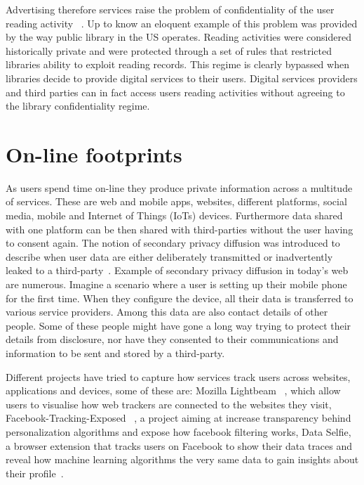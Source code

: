 Advertising therefore services raise the problem of confidentiality of the user reading activity ~\cite{ard2013confidentiality}. Up to know an eloquent example of this problem was provided by the way public library in the US operates. Reading activities were considered historically private and were protected through a set of rules that restricted libraries ability to exploit reading records. This regime is clearly bypassed when libraries decide to provide digital services to their users. Digital services providers and third parties can in fact access users reading activities without agreeing to the library confidentiality regime.

\section{On-line footprints}

As users spend time on-line they produce private information across a multitude of services. These are web and mobile apps, websites, different platforms, social media, mobile and Internet of Things (IoTs) devices. Furthermore data shared with one platform can be then shared with third-parties without the user having to consent again. The notion of secondary privacy diffusion was introduced to describe when user data are either deliberately transmitted or inadvertently leaked to a third-party~\cite{krishnamurthy2009privacy}. Example of secondary privacy diffusion in today's web are numerous. Imagine a scenario where a user is setting up their mobile phone for the first time. When they configure the device, all their data is transferred to various service providers. Among this data are also contact details of other people. Some of these people might have gone a long way trying to protect their details from disclosure, nor have they consented to their communications and information to be sent and stored by a third-party. 

Different projects have tried to capture how services track users across websites, applications and devices, some of these are: Mozilla Lightbeam ~\cite{lightbeam}, which allow users to visualise how web trackers are connected to the websites they visit, Facebook-Tracking-Exposed ~\cite{FTE}, a project aiming at increase transparency behind personalization algorithms and expose how facebook filtering works, Data Selfie, a browser extension that tracks users on Facebook to show their data traces and reveal how machine learning algorithms the very same data to gain insights about their profile~\cite{data-selfie}.

